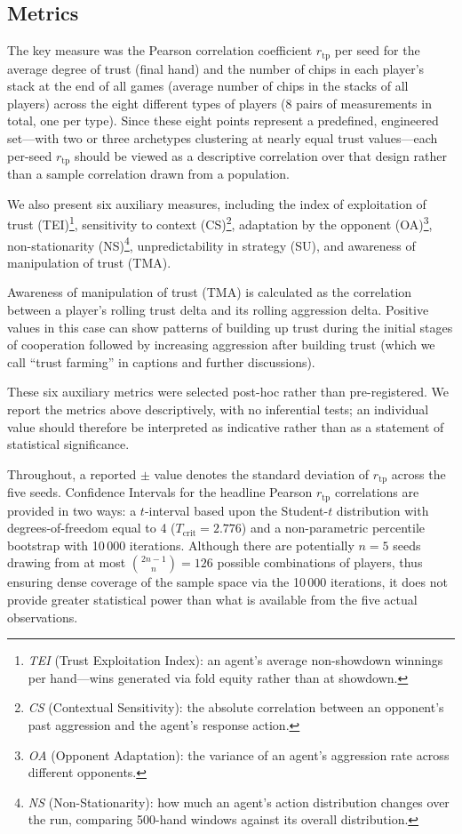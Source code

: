 \documentclass[10pt]{article} %
\newcommand{\rtp}{\ensuremath{r_{\mathrm{tp}}}}
\begin{document}
\subsection{Metrics}
The key measure was the Pearson correlation coefficient $\rtp$ per
seed for the average degree of trust (final hand) and the number of
chips in each player's stack at the end of all games (average number
of chips in the stacks of all players) across the eight different
types of players (8 pairs of measurements in total, one per type).
Since these eight points represent a predefined, engineered
set---with two or three archetypes clustering at nearly equal trust
values---each per-seed $\rtp$ should be viewed as a descriptive
correlation over that design rather than a sample correlation drawn
from a population.

We also present six auxiliary measures, including the index of
exploitation of trust (TEI)\footnote{\textit{TEI} (Trust Exploitation Index): an agent's average
non-showdown winnings per hand---wins generated via fold equity
rather than at showdown.},
sensitivity to context (CS)\footnote{\textit{CS} (Contextual Sensitivity): the absolute correlation
between an opponent's past aggression and the agent's response
action.}, adaptation by the opponent
(OA)\footnote{\textit{OA} (Opponent Adaptation): the variance of an agent's
aggression rate across different opponents.},
non-stationarity (NS)\footnote{\textit{NS} (Non-Stationarity): how much an agent's action
distribution changes over the run, comparing 500-hand windows against
its overall distribution.},
unpredictability in strategy (SU), and awareness of manipulation of
trust (TMA).

Awareness of manipulation of trust (TMA) is calculated as the
correlation between a player's rolling trust delta and its rolling
aggression delta. Positive values in this case can show patterns of
building up trust during the initial stages of cooperation followed
by increasing aggression after building trust (which we call ``trust
farming'' in captions and further discussions).

These six auxiliary metrics were selected post-hoc rather than
pre-registered. We report the metrics above descriptively, with no inferential
tests; an individual value should therefore be interpreted as
indicative rather than as a statement of statistical significance.

Throughout, a reported $\pm$ value denotes the standard deviation of
$\rtp$ across the five seeds. Confidence Intervals for the headline Pearson $\rtp$ correlations are
provided in two ways: a $t$-interval based upon the Student-$t$
distribution with degrees-of-freedom equal to 4 ($T_{\text{crit}} =
2.776$) and a non-parametric percentile bootstrap with 10\,000
iterations. Although there are potentially $n=5$ seeds drawing from
at most $\binom{2n-1}{n} = 126$ possible combinations of players,
thus ensuring dense coverage of the sample space via the 10\,000
iterations, it does not provide greater statistical power than what
is available from the five actual observations.
\end{document}
